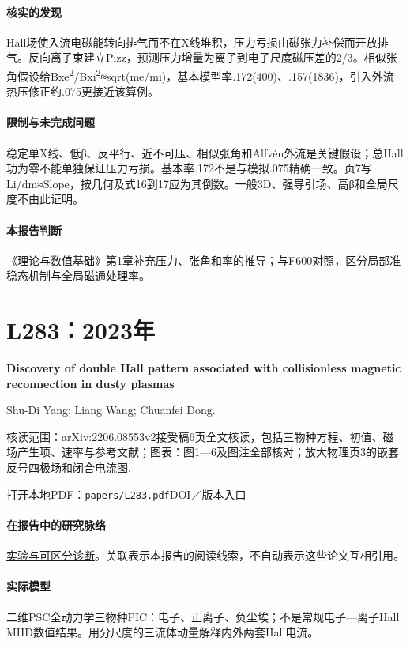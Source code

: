 \documentclass[UTF8,a4paper,11pt,openany,fontset=fandol]{ctexbook}
\begin{document}
\paragraph{核实的发现}Hall场使入流电磁能转向排气而不在X线堆积，压力亏损由磁张力补偿而开放排气。反向离子束建立Pizz，预测压力增量为离子到电子尺度磁压差的2/3。相似张角假设给Bxe\textsuperscript{2}/Bxi\textsuperscript{2}≈sqrt(me/mi)，基本模型率.172(400)、.157(1836)，引入外流热压修正约.075更接近该算例。

\paragraph{限制与未完成问题}稳定单X线、低β、反平行、近不可压、相似张角和Alfvén外流是关键假设；总Hall功为零不能单独保证压力亏损。基本率.172不是与模拟.075精确一致。页7写Li/dm≈Slope，按几何及式16到17应为其倒数。一般3D、强导引场、高β和全局尺度不由此证明。

\paragraph{本报告判断}《理论与数值基础》第1章补充压力、张角和率的推导；与F600对照，区分局部准稳态机制与全局磁通处理率。

\section{L283：2023年}\label{paper:L283}

\textbf{Discovery of double Hall pattern associated with collisionless magnetic reconnection in dusty plasmas}\citep{L283}\

Shu-Di Yang;  Liang Wang;  Chuanfei Dong.

\textsf{核读范围：}arXiv:2206.08553v2接受稿6页全文核读，包括三物种方程、初值、磁场产生项、速率与参考文献；\textsf{图表：}图1—6及图注全部核对；放大物理页3的嵌套反号四极场和闭合电流图.

\href{run:../papers/L283.pdf}{打开本地PDF：\texttt{papers/L283.pdf}}\quad\href{https://doi.org/10.1093/mnras/stad1453}{DOI／版本入口}

\paragraph{在报告中的研究脉络}\hyperref[story:diagnostic]{实验与可区分诊断}。关联表示本报告的阅读线索，不自动表示这些论文互相引用。

\paragraph{实际模型}二维PSC全动力学三物种PIC：电子、正离子、负尘埃；不是常规电子—离子Hall MHD数值结果。用分尺度的三流体动量解释内外两套Hall电流。
\end{document}

